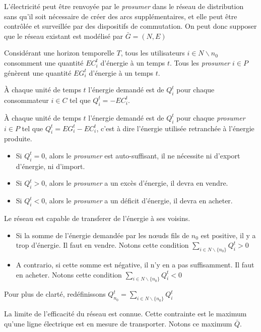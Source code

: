 L'électricité peut être renvoyée par le \textit{prosumer} dans le réseau de distribution sans qu'il soit nécessaire
de créer des arcs supplémentaires, et elle peut être contrôlée et surveillée par des dispositifs de commutation.
On peut donc supposer que le réseau existant est modélisé par $\bar{G} = (N, E)$

Considérant une horizon temporelle $T$,
tous les utilisateurs $i \in N \backslash n_0$ consomment une quantité
$EC^t_i$ d'énergie à un temps $t$.
Tous les \textit{prosumer} $i \in P$ génèrent une quantité
$EG^t_i$ d'énergie à un temps $t$.

À chaque unité de temps $t$ l'énergie demandé est de $Q^t_i$ pour chaque consommateur
$i \in C$ tel que $Q^t_i = -EC^t_i$.

À chaque unité de temps $t$ l'énergie demandé est de $Q^t_i$ pour chaque \textit{prosumer}
$i \in P$ tel que $Q^t_i = EG^t_i - EC^t_i$, c'est à dire l'énergie utilisée retranchée à l'énergie produite.

\begin{itemize}
  \item Si $Q^t_i = 0$, alors le \textit{prosumer} est auto-suffisant, il ne nécessite
    ni d'export d'énergie, ni d'import.
  \item Si $Q^t_i > 0$, alors le \textit{prosumer} a un excès d'énergie, il devra en vendre.
  \item Si $Q^t_i < 0$, alors le \textit{prosumer} a un déficit d'énergie, il devra en acheter.
\end{itemize}

Le réseau est capable de transferer de l'énergie à ses voisins.
\begin{itemize}
  \item Si la somme de l'énergie demandée par les nœuds fils de $n_0$ est positive, il y a trop d'énergie. Il faut en vendre.
    Notons cette condition $\sum_{i \in N \backslash \lbrace n_0 \rbrace} Q^t_i > 0$
  \item A contrario, si cette somme est négative, il n'y en a pas suffisamment. Il faut en acheter.
    Notons cette condition $\sum_{i \in N \backslash \lbrace n_0 \rbrace} Q^t_i < 0$
\end{itemize}

Pour plus de clarté, redéfinissons $Q^t_{n_0} = \sum_{i \in N \backslash \lbrace n_0 \rbrace} Q^t_i$

La limite de l'efficacité du réseau est connue.
Cette contrainte est le maximum qu'une ligne électrique est en mesure de transporter.
Notons ce maximum $\bar{Q}$.

